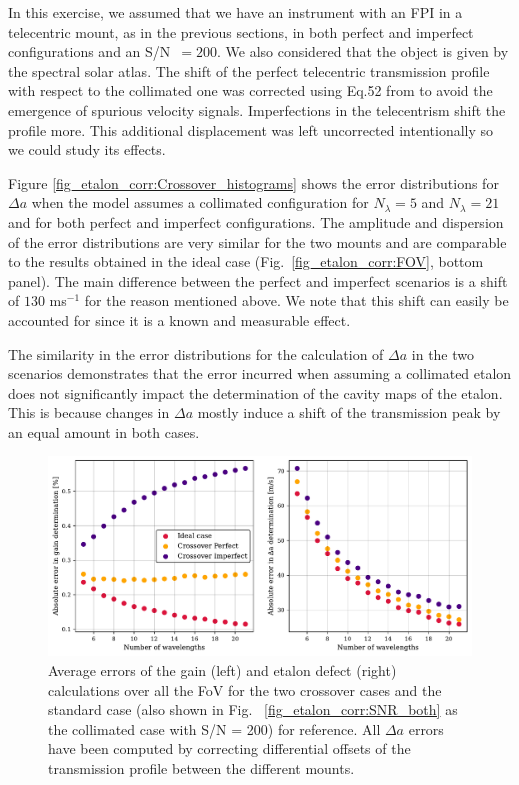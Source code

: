 In this exercise, we assumed that we have an instrument with an FPI in a telecentric mount, as in the previous sections, in both perfect and imperfect configurations and an S/N~$=200$. We also considered that the object is given by the spectral solar atlas. The shift of the perfect telecentric transmission profile with respect to the collimated one was corrected using Eq.52 from \cite{franI} to avoid the emergence of spurious velocity signals. Imperfections in the telecentrism shift the profile more. This additional displacement was left uncorrected intentionally so we could study its effects.

Figure \ref{fig_etalon_corr:Crossover_histograms} shows the error distributions for $\Delta a$ when the model assumes a collimated configuration for $N_\lambda=5$ and $N_\lambda=21$ and for both perfect and imperfect configurations. The amplitude and dispersion of the error distributions are very similar for the two mounts and are comparable to the results obtained in the ideal case (Fig.~\ref{fig_etalon_corr:FOV}, bottom panel). The main difference between the perfect and imperfect scenarios is a shift of $130$ ms$^{-1}$ for the reason mentioned above. We note that this shift can easily be accounted for since it is a known and measurable effect. 

The similarity in the error distributions for the calculation of $\Delta a$ in the two scenarios demonstrates that the error incurred when assuming a collimated etalon does not significantly impact the determination of the cavity maps of the etalon. This is because changes in $\Delta a$ mostly induce a shift of the transmission peak by an equal amount in both cases.


\begin{figure}
  \includegraphics[width=\textwidth]{figures/EtalonPaper/means.pdf}
  \caption{Average errors of the gain (left) and etalon defect (right) calculations over all the FoV for the two crossover cases and the standard case (also shown in Fig.~ \ref{fig_etalon_corr:SNR_both} as the collimated case with S/N = 200) for reference. All $\Delta a$ errors have been computed by correcting differential offsets of the transmission profile between the different mounts.\label{fig_etalon_corr:crossover}}  
\end{figure}

